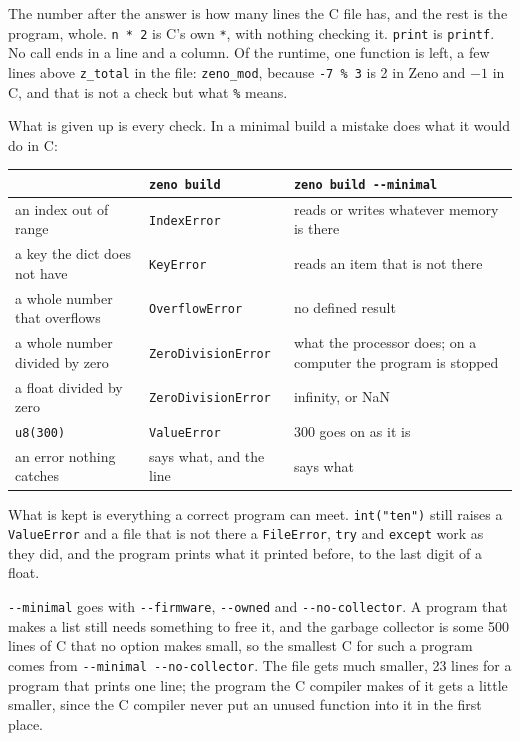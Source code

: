 The number after the answer is how many lines the C file has, and the
rest is the program, whole. \verb|n * 2| is C's own \verb|*|, with
nothing checking it. \verb|print| is \verb|printf|. No call ends in
a line and a column. Of the runtime, one function is left, a few lines
above \verb|z_total| in the file: \verb|zeno_mod|, because
\verb|-7 % 3| is 2 in Zeno and $-1$ in C, and that is not a check but
what \verb|%| means.

What is given up is every check. In a minimal build a mistake does
what it would do in C:

\begin{center}
\begin{tabular}{P{4.6cm}P{3.2cm}P{4.6cm}}
\toprule
 & \verb|zeno build| & \verb|zeno build --minimal| \\
\midrule
an index out of range & \verb|IndexError| & reads or writes whatever memory is there \\
a key the dict does not have & \verb|KeyError| & reads an item that is not there \\
a whole number that overflows & \verb|OverflowError| & no defined result \\
a whole number divided by zero & \texttt{Zero\-Division\-Error} & what the processor does; on a computer the program is stopped \\
a float divided by zero & \texttt{Zero\-Division\-Error} & infinity, or NaN \\
\verb|u8(300)| & \verb|ValueError| & 300 goes on as it is \\
an error nothing catches & says what, and the line & says what \\
\bottomrule
\end{tabular}
\end{center}

What is kept is everything a correct program can meet.
\verb|int("ten")| still raises a \verb|ValueError| and a file that is
not there a \verb|FileError|, \verb|try| and \verb|except| work as
they did, and the program prints what it printed before, to the last
digit of a float.

\verb|--minimal| goes with \verb|--firmware|, \verb|--owned| and
\verb|--no-collector|. A program that makes a list still needs
something to free it, and the garbage collector is some 500 lines of
C that no option makes small, so the smallest C for such a program
comes from \verb|--minimal --no-collector|. The file gets much
smaller, 23 lines for a program that prints one line; the program the
C compiler makes of it gets a little smaller, since the C compiler
never put an unused function into it in the first place.

